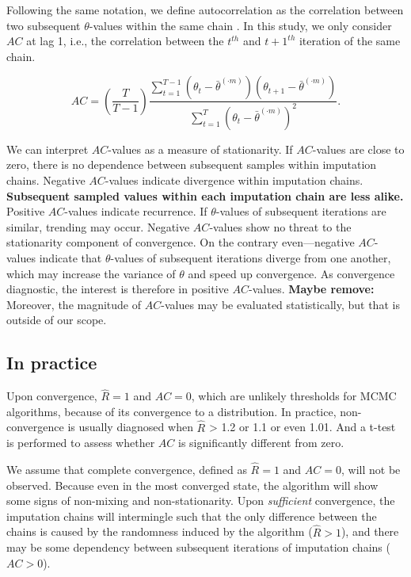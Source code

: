 \documentclass[Royal,times,sageh]{sagej}
\begin{document}
Following the same notation, we define autocorrelation as the
correlation between two subsequent \(\theta\)-values within the same
chain \citep[p.~147]{lync07}. In this study, we only consider \(AC\) at
lag 1, i.e., the correlation between the \(t^{th}\) and \(t+1^{th}\)
iteration of the same chain.

\begin{equation*}
AC = \left( \frac{T}{T-1} \right) \frac{\sum_{t=1}^{T-1}(\theta_t - \bar{\theta}^{(\cdot m)})(\theta_{t+1} - \bar{\theta}^{(\cdot m)})}{\sum_{t=1}^{T}(\theta_t - \bar{\theta}^{(\cdot m)})^2}.
\end{equation*}

We can interpret \(AC\)-values as a measure of stationarity. If
\(AC\)-values are close to zero, there is no dependence between
subsequent samples within imputation chains. Negative \(AC\)-values
indicate divergence within imputation chains. \textbf{Subsequent sampled
values within each imputation chain are less alike.} Positive
\(AC\)-values indicate recurrence. If \(\theta\)-values of subsequent
iterations are similar, trending may occur. Negative \(AC\)-values show
no threat to the stationarity component of convergence. On the contrary
even---negative \(AC\)-values indicate that \(\theta\)-values of
subsequent iterations diverge from one another, which may increase the
variance of \(\theta\) and speed up convergence. As convergence
diagnostic, the interest is therefore in positive \(AC\)-values.
\textbf{Maybe remove:} Moreover, the magnitude of \(AC\)-values may be
evaluated statistically, but that is outside of our scope.

\hypertarget{in-practice}{%
\subsection{In practice}\label{in-practice}}

Upon convergence, \(\widehat{R}=1\) and \(AC=0\), which are unlikely
thresholds for MCMC algorithms, because of its convergence to a
distribution. In practice, non-convergence is usually diagnosed when
\(\widehat{R}\) \textgreater{} 1.2 or 1.1 or even 1.01. And a t-test is
performed to assess whether \(AC\) is significantly different from zero.

We assume that complete convergence, defined as \(\widehat{R} = 1\) and
\(AC = 0\), will not be observed. Because even in the most converged
state, the algorithm will show some signs of non-mixing and
non-stationarity. Upon \emph{sufficient} convergence, the imputation
chains will intermingle such that the only difference between the chains
is caused by the randomness induced by the algorithm
(\(\widehat{R} > 1\)), and there may be some dependency between
subsequent iterations of imputation chains (\(AC > 0\)).
\end{document}
